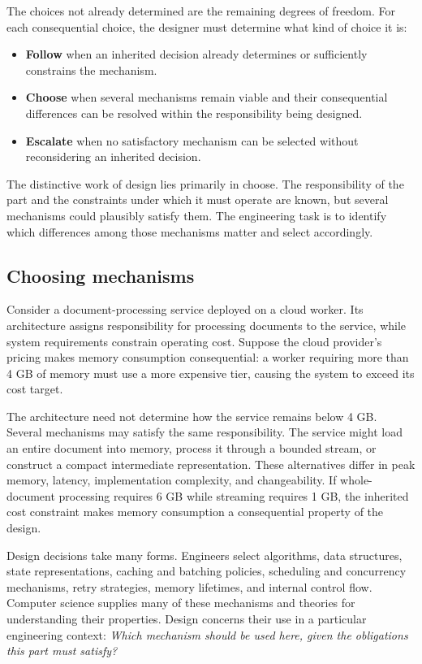 The choices not already determined are the remaining degrees of freedom.
For each consequential choice, the designer must determine what kind of choice it is:

\begin{itemize}
\tightlist
\item
  \textbf{Follow} when an inherited decision already determines or sufficiently constrains the mechanism.
\item
  \textbf{Choose} when several mechanisms remain viable and their consequential differences can be resolved within the responsibility being designed.
\item
  \textbf{Escalate} when no satisfactory mechanism can be selected without reconsidering an inherited decision.
\end{itemize}

The distinctive work of design lies primarily in choose.
The responsibility of the part and the constraints under which it must operate are known, but several mechanisms could plausibly satisfy them.
The engineering task is to identify which differences among those mechanisms matter and select accordingly.

\subsection{Choosing mechanisms}\label{choosing-mechanisms}

Consider a document-processing service deployed on a cloud worker.
Its architecture assigns responsibility for processing documents to the service, while system requirements constrain operating cost.
Suppose the cloud provider's pricing makes memory consumption consequential: a worker requiring more than 4 GB of memory must use a more expensive tier, causing the system to exceed its cost target.

The architecture need not determine how the service remains below 4 GB.
Several mechanisms may satisfy the same responsibility.
The service might load an entire document into memory, process it through a bounded stream, or construct a compact intermediate representation.
These alternatives differ in peak memory, latency, implementation complexity, and changeability.
If whole-document processing requires 6 GB while streaming requires 1 GB, the inherited cost constraint makes memory consumption a consequential property of the design.

Design decisions take many forms.
Engineers select algorithms, data structures, state representations, caching and batching policies, scheduling and concurrency mechanisms, retry strategies, memory lifetimes, and internal control flow.
Computer science supplies many of these mechanisms and theories for understanding their properties.
Design concerns their use in a particular engineering context: \emph{Which mechanism should be used here, given the obligations this part must satisfy?}

